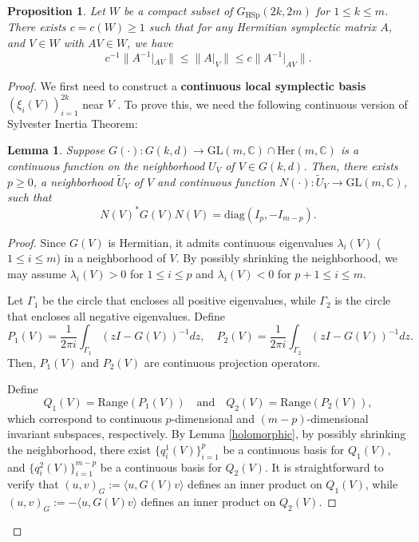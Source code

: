 \documentclass[11pt]{amsart}
\newtheorem{lemma}[theorem]{Lemma}
\newtheorem{proposition}[theorem]{Proposition}
\theoremstyle{remark}
\theoremstyle{definition}
\newcommand{\C}{{\mathbf C}}
\def \C{{\mathcal{C}}}
\def\C{{\mathbb C}}
\begin{document}
\begin{proposition}\label{lem: est reverse norm}
Let $W$ be a compact subset of $G_{\mathrm{HSp}}(2k,2m)$ for $1 \leq k \leq m$. There exists $c = c(W) \geq 1$ such that  for any Hermitian symplectic matrix $A$, and $V \in W$ with $AV \in W$, we have 
\begin{equation*}\label{eqn: est reverse norm}
c^{-1} \|A^{-1}|_{AV}\| \leq \|A|_V\| \leq c \|A^{-1}|_{AV}\|.
\end{equation*}
\end{proposition}

\begin{proof}

We first need to construct a \textbf{continuous local symplectic basis} \((\xi_i(V))_{i=1}^{2k}\) near \( V \) . To prove this, we need the following continuous version of Sylvester Inertia Theorem: 
\begin{lemma}\label{ht}
   Suppose $G(\cdot):G(k,d)\rightarrow \mathrm{GL}(m, \mathbb{C})\cap \mathrm{Her}(m,\C)$ is a continuous function on the neighborhood $U_V$ of $V\in G(k,d)$. Then, there exists $p\geq 0$, a neighborhood $\tilde{U}_V$ of $V$ and continuous function $N(\cdot): \tilde{U}_V\rightarrow \mathrm{GL}(m, \mathbb{C}) $,  such that $$N(V)^*G(V)N(V)=\text{diag}(I_p, -I_{m-p}).$$
\end{lemma}
\begin{proof}
    Since $G(V)$ is Hermitian, it admits continuous eigenvalues \(\lambda_i(V)\) (\(1 \leq i \leq m\)) in a neighborhood of \( V \). By possibly shrinking the neighborhood, we may assume \(\lambda_i(V) > 0\) for \(1 \leq i \leq p\) and \(\lambda_i(V) < 0\) for \(p+1 \leq i \leq m\). 


Let $\Gamma_1$ be the circle that encloses all positive eigenvalues, while $\Gamma_2$ is the circle that encloses all negative eigenvalues. Define
			$$
			P_1(V) = \frac{1}{2\pi i}\int_{\Gamma_1}(zI-G(V))^{-1} dz, \quad P_2(V) = \frac{1}{2\pi i}\int_{\Gamma_2}(zI-G(V))^{-1} dz.
			$$
			Then, $P_1(V)$ and $P_2(V)$ are continuous projection operators. 

            
			Define
			$$
			Q_1(V) = \text{Range}(P_1(V)) \quad \text{and} \quad Q_2(V) = \text{Range}(P_2(V)),
			$$
			which correspond to continuous $p$-dimensional and $(m-p)$-dimensional invariant subspaces, respectively.
		By Lemma \ref{holomorphic}, by possibly shrinking the neighborhood, there exist $\{q^1_i(V)\}_{i=1}^p$ be a continuous basis for $Q_1(V)$, and $\{q^2_i(V)\}_{i=1}^{m-p}$ be a continuous basis for $Q_2(V)$. It is straightforward to verify that $(u,v)_G := \langle u,G(V)v \rangle$ defines an inner product on $Q_1(V)$, while $(u,v)_G := -\langle u,G(V)v \rangle$ defines an inner product on $Q_2(V)$.
			

\end{proof}
\end{proof}
\end{document}
